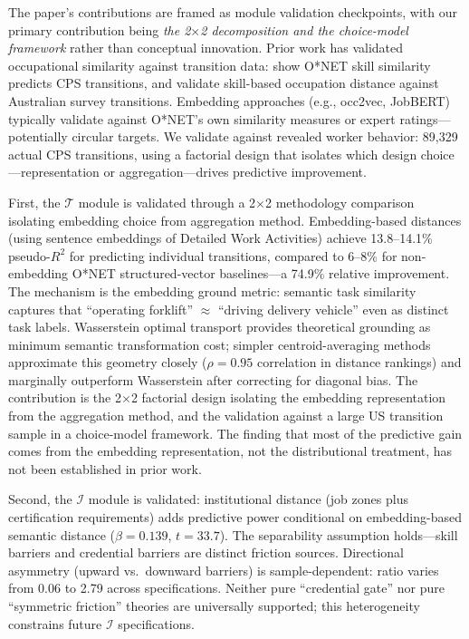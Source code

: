 \documentclass[12pt]{article}
\begin{document}
The paper's contributions are framed as module validation checkpoints, with our primary contribution being \emph{the 2$\times$2 decomposition and the choice-model framework} rather than conceptual innovation. Prior work has validated occupational similarity against transition data: \citet{frank2024network} show O*NET skill similarity predicts CPS transitions, and \citet{dawson2021skill} validate skill-based occupation distance against Australian survey transitions. Embedding approaches (e.g., occ2vec, JobBERT) typically validate against O*NET's own similarity measures or expert ratings---potentially circular targets. We validate against revealed worker behavior: 89,329 actual CPS transitions, using a factorial design that isolates which design choice---representation or aggregation---drives predictive improvement.

First, the $\mathcal{T}$ module is validated through a 2$\times$2 methodology comparison isolating embedding choice from aggregation method. Embedding-based distances (using sentence embeddings of Detailed Work Activities) achieve 13.8--14.1\% pseudo-$R^2$ for predicting individual transitions, compared to 6--8\% for non-embedding O*NET structured-vector baselines---a 74.9\% relative improvement. The mechanism is the embedding ground metric: semantic task similarity captures that ``operating forklift'' $\approx$ ``driving delivery vehicle'' even as distinct task labels. Wasserstein optimal transport provides theoretical grounding as minimum semantic transformation cost; simpler centroid-averaging methods approximate this geometry closely ($\rho = 0.95$ correlation in distance rankings) and marginally outperform Wasserstein after correcting for diagonal bias. The contribution is the 2$\times$2 factorial design isolating the embedding representation from the aggregation method, and the validation against a large US transition sample in a choice-model framework. The finding that most of the predictive gain comes from the embedding representation, not the distributional treatment, has not been established in prior work.

Second, the $\mathcal{I}$ module is validated: institutional distance (job zones plus certification requirements) adds predictive power conditional on embedding-based semantic distance ($\beta = 0.139$, $t = 33.7$). The separability assumption holds---skill barriers and credential barriers are distinct friction sources. Directional asymmetry (upward vs.\ downward barriers) is sample-dependent: ratio varies from 0.06 to 2.79 across specifications. Neither pure ``credential gate'' nor pure ``symmetric friction'' theories are universally supported; this heterogeneity constrains future $\mathcal{I}$ specifications.
\end{document}

